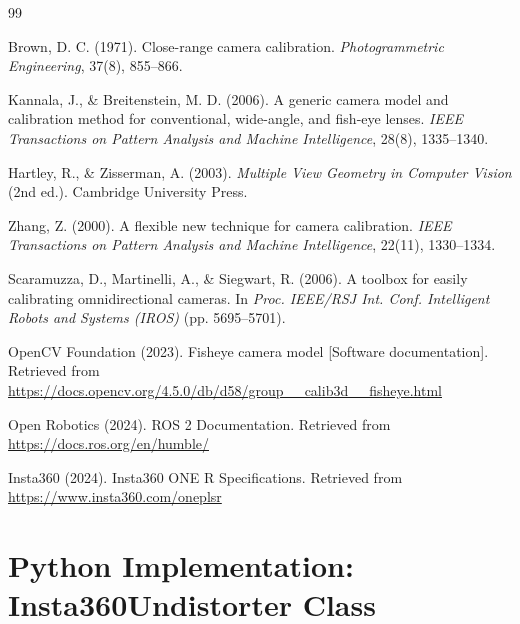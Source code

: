 \documentclass[11pt,a4paper,oneside]{article}
\begin{document}
\newpage

\begin{thebibliography}{99}

Brown, D. C. (1971).
\newblock Close-range camera calibration.
\newblock \emph{Photogrammetric Engineering}, 37(8), 855--866.

Kannala, J., \& Breitenstein, M. D. (2006).
\newblock A generic camera model and calibration method for conventional, wide-angle, and fish-eye lenses.
\newblock \emph{IEEE Transactions on Pattern Analysis and Machine Intelligence}, 28(8), 1335--1340.

Hartley, R., \& Zisserman, A. (2003).
\newblock \emph{Multiple View Geometry in Computer Vision} (2nd ed.).
\newblock Cambridge University Press.

Zhang, Z. (2000).
\newblock A flexible new technique for camera calibration.
\newblock \emph{IEEE Transactions on Pattern Analysis and Machine Intelligence}, 22(11), 1330--1334.

Scaramuzza, D., Martinelli, A., \& Siegwart, R. (2006).
\newblock A toolbox for easily calibrating omnidirectional cameras.
\newblock In \emph{Proc. IEEE/RSJ Int. Conf. Intelligent Robots and Systems (IROS)} (pp. 5695--5701).

OpenCV Foundation (2023).
\newblock Fisheye camera model [Software documentation].
\newblock Retrieved from \url{https://docs.opencv.org/4.5.0/db/d58/group__calib3d__fisheye.html}

Open Robotics (2024).
\newblock ROS 2 Documentation.
\newblock Retrieved from \url{https://docs.ros.org/en/humble/}

Insta360 (2024).
\newblock Insta360 ONE R Specifications.
\newblock Retrieved from \url{https://www.insta360.com/oneplsr}

\end{thebibliography}


\appendix

\section{Python Implementation: Insta360Undistorter Class}
\label{app:code}
\end{document}
